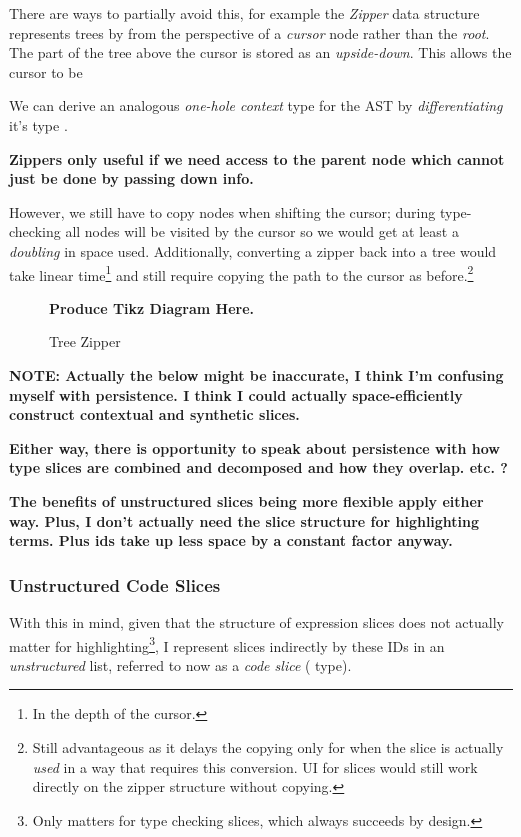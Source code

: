 There are ways to partially avoid this, for example the \textit{Zipper} data structure represents trees by from the perspective of a \textit{cursor} node rather than the \textit{root}. The part of the tree above the cursor is stored as an \textit{upside-down}. This allows the cursor to be 

We can derive an analogous \textit{one-hole context} type for the AST by \textit{differentiating} it's type \cite{OneHoleContext, TypeDerivatives}. 


\textbf{Zippers only useful if we need access to the parent node which cannot just be done by passing down info.}

However, we still have to copy nodes when shifting the cursor; during type-checking all nodes will be visited by the cursor so we would get at least a \textit{doubling} in space used. Additionally, converting a zipper back into a tree would take linear time\footnote{In the depth of the cursor.} and still require copying the path to the cursor as before.\footnote{Still advantageous as it delays the copying only for when the slice is actually \textit{used} in a way that requires this conversion. UI for slices would still work directly on the zipper structure without copying.} 

\begin{figure}[h]
\textbf{Produce Tikz Diagram Here.}
\caption{Tree Zipper}
\label{fig:PersistentZipper}
\end{figure}


\textbf{NOTE: Actually the below might be inaccurate, I think I'm confusing myself with persistence. I think I could actually space-efficiently construct contextual and synthetic slices.}

\textbf{Either way, there is opportunity to speak about persistence with how type slices are combined and decomposed and how they overlap. etc. ?}

\textbf{The benefits of unstructured slices being more flexible apply either way. Plus, I don't actually need the slice structure for highlighting terms. Plus ids take up less space by a constant factor anyway.}

\subsubsection{Unstructured Code Slices}
\label{sec:UnstructuredSlices}
With this in mind, given that the structure of expression slices does not actually matter for highlighting\footnote{Only matters for type checking slices, which always succeeds by design.}, I represent slices indirectly by these IDs in an \textit{unstructured} list, referred to now as a \textit{code slice} ( type).

